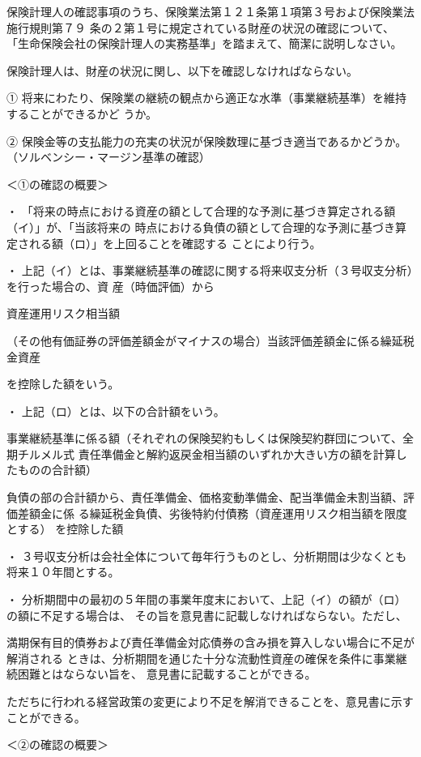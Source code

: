 \documentclass[report,gutter=10mm,fore-edge=10mm,uplatex,dvipdfmx]{jlreq}
\begin{document}
保険計理人の確認事項のうち、保険業法第１２１条第１項第３号および保険業法施行規則第７９
条の２第１号に規定されている財産の状況の確認について、
「生命保険会社の保険計理人の実務基準」を踏まえて、簡潔に説明しなさい。

\answer{}
保険計理人は、財産の状況に関し、以下を確認しなければならない。

① 将来にわたり、保険業の継続の観点から適正な水準（事業継続基準）を維持することができるかど
うか。

② 保険金等の支払能力の充実の状況が保険数理に基づき適当であるかどうか。
（ソルベンシー・マージン基準の確認）

＜①の確認の概要＞

・ 「将来の時点における資産の額として合理的な予測に基づき算定される額（イ）」が、「当該将来の
時点における負債の額として合理的な予測に基づき算定される額（ロ）」を上回ることを確認する
ことにより行う。

・ 上記（イ）とは、事業継続基準の確認に関する将来収支分析（３号収支分析）を行った場合の、資
産（時価評価）から

資産運用リスク相当額

（その他有価証券の評価差額金がマイナスの場合）当該評価差額金に係る繰延税金資産

を控除した額をいう。

・ 上記（ロ）とは、以下の合計額をいう。

事業継続基準に係る額（それぞれの保険契約もしくは保険契約群団について、全期チルメル式
責任準備金と解約返戻金相当額のいずれか大きい方の額を計算したものの合計額）

負債の部の合計額から、責任準備金、価格変動準備金、配当準備金未割当額、評価差額金に係
る繰延税金負債、劣後特約付債務（資産運用リスク相当額を限度とする） を控除した額

・ ３号収支分析は会社全体について毎年行うものとし、分析期間は少なくとも将来１０年間とする。

・ 分析期間中の最初の５年間の事業年度末において、上記（イ）の額が（ロ）の額に不足する場合は、
その旨を意見書に記載しなければならない。ただし、


満期保有目的債券および責任準備金対応債券の含み損を算入しない場合に不足が解消される
ときは、分析期間を通じた十分な流動性資産の確保を条件に事業継続困難とはならない旨を、
意見書に記載することができる。


ただちに行われる経営政策の変更により不足を解消できることを、意見書に示すことができる。

＜②の確認の概要＞
\end{document}
